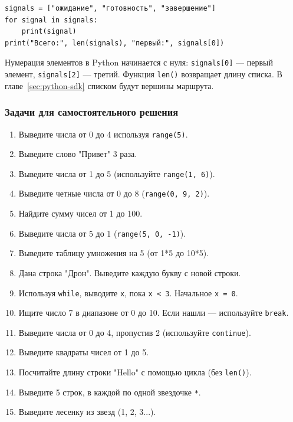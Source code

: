 \begin{codebox}
\begin{verbatim}
signals = ["ожидание", "готовность", "завершение"]
for signal in signals:
    print(signal)
print("Всего:", len(signals), "первый:", signals[0])
\end{verbatim}
\end{codebox}

Нумерация элементов в Python начинается с нуля: \texttt{signals[0]} --- первый элемент, \texttt{signals[2]} --- третий. Функция \texttt{len()} возвращает длину списка. В главе~\ref{sec:python-sdk} списком будут вершины маршрута.

\subsubsection*{Задачи для самостоятельного решения}

\begin{enumerate}
    \item Выведите числа от 0 до 4 используя \texttt{range(5)}.
    \item Выведите слово "Привет" 3 раза.
    \item Выведите числа от 1 до 5 (используйте \texttt{range(1, 6)}).
    \item Выведите четные числа от 0 до 8 (\texttt{range(0, 9, 2)}).
    \item Найдите сумму чисел от 1 до 100.
    \item Выведите числа от 5 до 1 (\texttt{range(5, 0, -1)}).
    \item Выведите таблицу умножения на 5 (от 1*5 до 10*5).
    \item Дана строка "Дрон". Выведите каждую букву с новой строки.
    \item Используя \texttt{while}, выводите \texttt{x}, пока \texttt{x < 3}. Начальное \texttt{x = 0}.
    \item Ищите число 7 в диапазоне от 0 до 10. Если нашли — используйте \texttt{break}.
    \item Выведите числа от 0 до 4, пропустив 2 (используйте \texttt{continue}).
    \item Выведите квадраты чисел от 1 до 5.
    \item Посчитайте длину строки "Hello" с помощью цикла (без \texttt{len()}).
    \item Выведите 5 строк, в каждой по одной звездочке \texttt{*}.
    \item Выведите лесенку из звезд (1, 2, 3...).
\end{enumerate}

